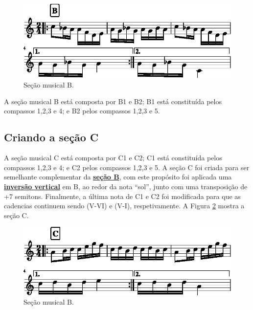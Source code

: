      \begin{figure}[H]
	     \centering
	     \includegraphics[width=\textwidth]{chapters/cap-musica-topicos/section-b-1.eps}
	     \caption{Seção musical B.}
	     \label{fig:section-b}
     \end{figure}
A seção musical B está composta por B1 e B2; B1 está constituída pelos compassos 1,2,3 e 4; e B2 pelos compassos 1,2,3 e 5.

\subsection{Criando a seção C}
\label{subsec:criandoc}
A seção musical C está composta por C1 e C2; 
C1 está constituída pelos compassos 1,2,3 e 4; e C2 pelos compassos 1,2,3 e 5.
A seção C foi criada para ser semelhante complementar da \hyperref[subsec:criandoa]{\textbf{seção B}},
com este propósito foi aplicada uma \hyperref[subsec:inversaovertical]{\textbf{inversão vertical}} em B,
ao redor da nota ``sol'', junto com uma transposição de +7 semitons.
Finalmente, a última nota de C1 e C2 foi modificada para que as cadencias continuem sendo (V-VI)  e (V-I),
respetivamente. 
A Figura \ref{fig:section-c} mostra a seção C.
     \begin{figure}[H]
	     \centering
	     \includegraphics[width=\textwidth]{chapters/cap-musica-topicos/section-c-1.eps}
	     \caption{Seção musical B.}
	     \label{fig:section-c}
     \end{figure}

